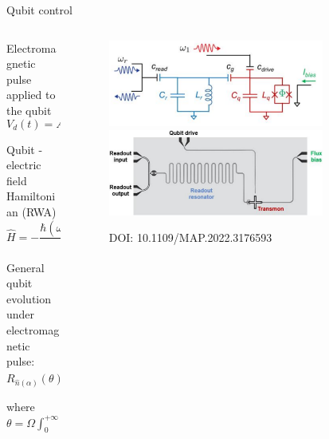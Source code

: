 \documentclass[aspectratio=169,10pt]{beamer}
\begin{document}
\begin{frame}{Qubit control}

  \begin{columns}
    \begin{column}{0.45\textwidth}
      Electromagnetic pulse applied to the qubit
      \begin{equation*}
        V_d(t) = A\varepsilon(t)\sin{(\omega_d t + \alpha)},
      \end{equation*}
    
      Qubit - electric field Hamiltonian (RWA)
      \begin{equation*}
        \hat{H} = -\frac{\hbar (\omega_q - \omega_d)}{2} \hat{\sigma}_z + \frac{\hbar \Omega}{2} \varepsilon(t) \left( \hat{\sigma}_x \cos \alpha + \hat{\sigma}_y \sin \alpha \right)
      \end{equation*}
    
      General qubit evolution under electromagnetic pulse:
      \begin{equation*}
        R_{\hat{n}(\alpha)}(\theta) = e^{-\frac{i}{2} \hat{n}(\alpha) \cdot \vec{\sigma} \theta} = e^{-\frac{i}{2} (\hat{\sigma}_x \cos \alpha + \hat{\sigma}_y \sin \alpha) \theta}
      \end{equation*}
    
      where $\theta = \Omega\int_{0}^{+\infty}\varepsilon(t')dt'$
    \end{column}
    \begin{column}{0.55\textwidth}
      \centering
      \begin{figure}
        \vspace{2mm}
        \includegraphics[width=0.8\textwidth]{figures/TransmonCircuit.png}
        \vfill
        \includegraphics[width=0.8\textwidth]{figures/TransmonBoard.png}
        \caption{DOI: 10.1109/MAP.2022.3176593}
      \end{figure}
    \end{column}
  \end{columns}   


\end{frame}
\end{document}

